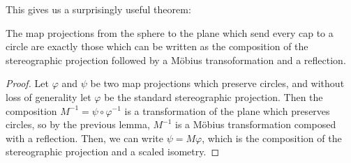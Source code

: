 This gives us a surprisingly useful theorem:
\begin{theorem}\label{thm:stereographic_mobius}
  The map projections from the sphere to the plane which send every
  cap to a circle are exactly those which can be written as the
  composition of the stereographic projection followed by a 
  M\"{o}bius transoformation and a reflection.
\end{theorem}
\begin{proof}
  Let $\varphi$ and $\psi$ be two map projections which preserve
  circles, and without loss of generality let $\varphi$ be the
  standard stereographic projection.  Then the composition
  $M^{-1}=\psi\circ\varphi^{-1}$ is a transformation of 
  the plane which preserves circles, so by the previous lemma, 
  $M^{-1}$ is a M\"{o}bius transformation composed with a reflection. 
  Then, we can write $\psi= M\varphi$, which is the
  composition of the stereographic projection and a scaled isometry.
\end{proof}

